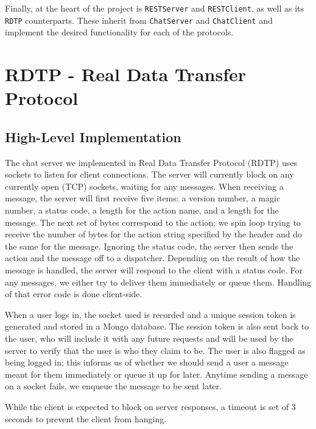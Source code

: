 \documentclass[10pt]{article}
\begin{document}
\medskip

Finally, at the heart of the project is \verb|RESTServer| and \verb|RESTClient|,
as well as its \verb|RDTP| counterparts. These inherit from \verb|ChatServer|
and \verb|ChatClient| and implement the desired functionality for each of
the protocols.

\section{RDTP - Real Data Transfer Protocol}

\subsection{High-Level Implementation}

The chat server we implemented in Real Data Transfer Protocol (RDTP) uses sockets to listen for client connections. The server will currently block on any currently open (TCP) sockets, waiting for any messages. When receiving a message, the server will first receive five items: a version number, a magic number, a status code, a length for the action name, and a length for the message. The next set of bytes correspond to the action; we spin loop trying to receive the number of bytes for the action string specified by the header and do the same for the message. Ignoring the status code, the server then sends the action and the message off to a dispatcher. Depending on the result of how the message is handled, the server will respond to the client with a status code. For any messages, we either try to deliver them immediately or queue them. Handling of that error code is done client-side.

\medskip

When a user logs in, the socket used is recorded and a unique session token is generated and stored in a Mongo database. The session token is also sent back to the user, who will include it with any future requests and will be used by the server to verify that the user is who they claim to be. The user is also flagged as being logged in; this informs us of whether we should send a user a message meant for them immediately or queue it up for later. Anytime sending a message on a socket fails, we enqueue the message to be sent later.

\medskip
    
While the client is expected to block on server responses, a timeout is set of 3 seconds to prevent the client from hanging.
\end{document}
